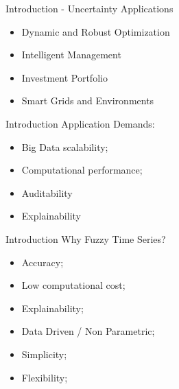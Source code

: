 \documentclass{beamer}
\begin{document}
\begin{frame}{Introduction - Uncertainty}
\linespread{2}
Applications
\begin{itemize}
\item Dynamic and Robust Optimization
\item Intelligent Management
\item Investment Portfolio 
\item Smart Grids and Environments
\end{itemize}
\end{frame}

\note[itemize]{
\item 
}


\begin{frame}{Introduction}
\linespread{2}
Application Demands:
\begin{itemize}
    \item Big Data scalability;
    \item Computational performance;
    \item Auditability 
    \item Explainability 
\end{itemize}
\end{frame}



\begin{frame}{Introduction}
\linespread{2}
Why Fuzzy Time Series?
\begin{itemize}
\item Accuracy;
\item Low computational cost;
\item Explainability;
\item Data Driven / Non Parametric;
\item Simplicity;
\item Flexibility;
\end{itemize}
\end{frame}
\end{document}
